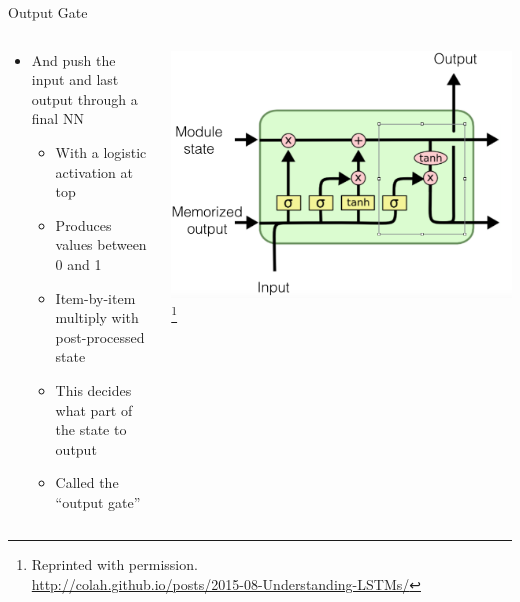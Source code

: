 \documentclass[aspectratio=169]{beamer}
\begin{document}
\begin{frame}{Output Gate}

\begin{columns}
\begin{column}{0.5\textwidth}
\begin{itemize}
	\item And push the input and last output through a final NN
	\begin{itemize}
		\item With a logistic activation at top
		\item Produces values between 0 and 1
		\item Item-by-item multiply with post-processed state
		\item This decides what part of the state to output
		\item Called the ``output gate''
	\end{itemize}
\end{itemize}
\end{column}
\begin{column}{0.5\textwidth}
\includegraphics[width=1\textwidth]{lectLSTM/output.png}
\footnote{Reprinted with permission.\\ \hspace{1.7em}\url{http://colah.github.io/posts/2015-08-Understanding-LSTMs/}}
\end{column}
\end{columns}
\end{frame}
\end{document}
